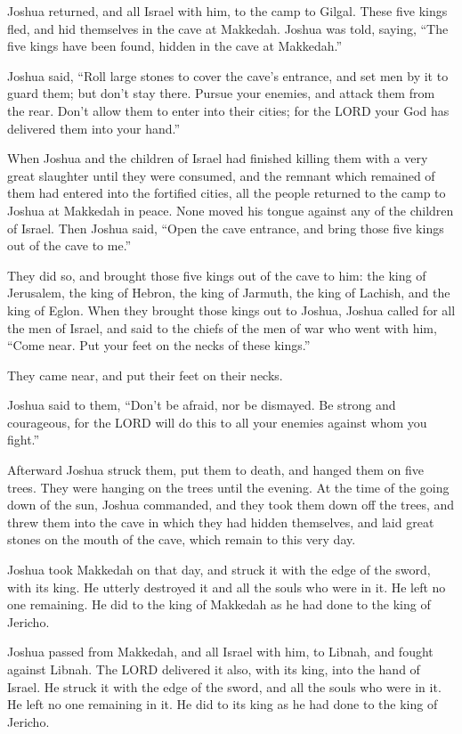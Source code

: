 \myverse{}Joshua returned, and all Israel with him, to the camp to Gilgal.
\myverse{}These five kings fled, and hid themselves in the cave at Makkedah.
\myverse{}Joshua was told, saying, “The five kings have been found, hidden in the cave
at Makkedah.”

\myverse{}Joshua said, “Roll large stones to cover the cave’s entrance,
and set men by it to guard them;
\myverse{}but don’t stay there. Pursue your enemies, and attack them from the rear.
Don’t allow them to enter into their cities; for the LORD your God has delivered them into your hand.”

\myverse{}When Joshua and the children of Israel had finished killing
them with a very great slaughter until they were consumed, and the remnant which remained of them had
entered into the fortified cities,
\myverse{}all the people returned to the camp to Joshua at Makkedah in peace. None
moved his tongue against any of the children of Israel.
\myverse{}Then Joshua said, “Open the cave entrance, and bring those five kings out
of the cave to me.”

\myverse{}They did so, and brought those five kings out of the cave to
him: the king of Jerusalem, the king of Hebron, the king of Jarmuth, the king of Lachish, and the king
of Eglon.
\myverse{}When they brought those kings out to Joshua, Joshua called for all the men
of Israel, and said to the chiefs of the men of war who went with him, “Come near. Put your feet on the
necks of these kings.”

They came near, and put their feet on their necks.

\myverse{}Joshua said to them, “Don’t be afraid, nor be dismayed. Be strong
and courageous, for the LORD will do this to all your enemies against whom you fight.”

\myverse{}Afterward Joshua struck them, put them to death, and hanged
them on five trees. They were hanging on the trees until the evening.
\myverse{}At the time of the going down of the sun, Joshua commanded, and they took
them down off the trees, and threw them into the cave in which they had hidden themselves, and laid great
stones on the mouth of the cave, which remain to this very day.

\myverse{}Joshua took Makkedah on that day, and struck it with the edge
of the sword, with its king. He utterly destroyed it and all the souls who were in it. He left no one
remaining. He did to the king of Makkedah as he had done to the king of Jericho.

\myverse{}Joshua passed from Makkedah, and all Israel with him, to Libnah,
and fought against Libnah.
\myverse{}The LORD delivered it also, with its king, into the hand of Israel. He struck
it with the edge of the sword, and all the souls who were in it. He left no one remaining in it. He did
to its king as he had done to the king of Jericho.

